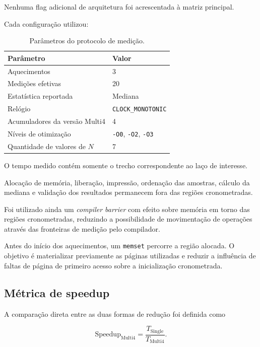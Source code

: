 Nenhuma flag adicional de arquitetura foi acrescentada à matriz principal.

Cada configuração utilizou:

\begin{table}[htbp]
    \centering
    \caption{Parâmetros do protocolo de medição.}
    \label{tab:atvd02-medicao}
    \begin{tabular}{l|l}
        \hline
        Parâmetro & Valor \\
        \hline
        Aquecimentos & 3 \\
        Medições efetivas & 20 \\
        Estatística reportada & Mediana \\
        Relógio & \texttt{CLOCK\_MONOTONIC} \\
        Acumuladores da versão Multi4 & 4 \\
        Níveis de otimização & \texttt{-O0}, \texttt{-O2}, \texttt{-O3} \\
        Quantidade de valores de \(N\) & 7 \\
        \hline
    \end{tabular}
\end{table}

O tempo medido contém somente o trecho correspondente ao laço de interesse.

Alocação de memória, liberação, impressão, ordenação das amostras, cálculo da mediana e
validação dos resultados permanecem fora das regiões cronometradas.

Foi utilizado ainda um \textit{compiler barrier} com efeito sobre memória em torno das regiões
cronometradas, reduzindo a possibilidade de movimentação de operações através das fronteiras
de medição pelo compilador.

Antes do início dos aquecimentos, um \texttt{memset} percorre a região alocada. O objetivo é
materializar previamente as páginas utilizadas e reduzir a influência de faltas de página de
primeiro acesso sobre a inicialização cronometrada.


\subsection{Métrica de speedup}

A comparação direta entre as duas formas de redução foi definida como

\begin{equation}
\text{Speedup}_{\text{Multi4}}
=
\frac{T_{\text{Single}}}
     {T_{\text{Multi4}}}.
\end{equation}

